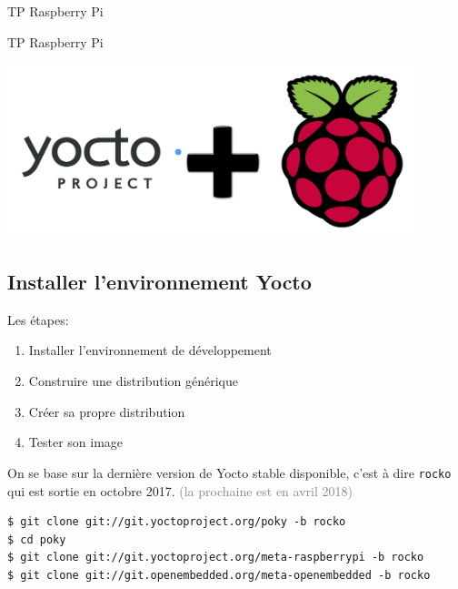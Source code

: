 \documentclass[compress]{smilebeamer}
\begin{document}
\begin{frame}{TP Raspberry Pi}
\end{frame}

\begin{frame}{TP Raspberry Pi}
\begin{center}
\includegraphics[width=0.9\textwidth]{logos/yocto_plus_raspberry_pi.png}
\end{center}
\end{frame}

\subsection{Installer l'environnement Yocto}
\begin{frame}
Les étapes:
\begin{enumerate}
	\item Installer l'environnement de développement
	\item Construire une distribution générique
	\item Créer sa propre distribution
	\item Tester son image
\end{enumerate}
\end{frame}

\begin{frame}[fragile]
On se base sur la dernière version de Yocto stable disponible, c'est à dire \texttt{rocko} qui est sortie en octobre 2017. \textcolor{gray}{\tiny{(la prochaine est en avril 2018)}}
\begin{lstlisting}[style=shell]
$ git clone git://git.yoctoproject.org/poky -b rocko
$ cd poky
$ git clone git://git.yoctoproject.org/meta-raspberrypi -b rocko
$ git clone git://git.openembedded.org/meta-openembedded -b rocko
\end{lstlisting}
\end{frame}
\end{document}
